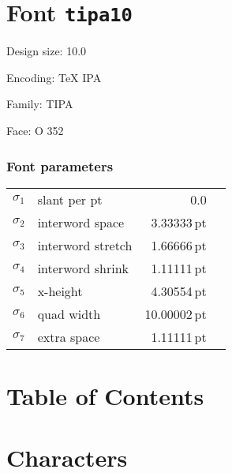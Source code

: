 \documentclass{article}
\newlength{\maxcharwidth}
\begin{document}
\setlength{\maxcharwidth}{60.00016pt}
\addtolength{\maxcharwidth}{2\fboxsep}

\section{Font \texttt{tipa10}}


Design size: 10.0\,

Encoding: TeX IPA

Family: TIPA

Face: O 352

\subsubsection{Font parameters}

\begin{tabular}{@{}llr@{\quad}l}
$\sigma_1$ & slant per pt & 0.0 \\
$\sigma_2$ & interword space & 3.33333\,pt \\
$\sigma_3$ & interword stretch & 1.66666\,pt \\
$\sigma_4$ & interword shrink & 1.11111\,pt \\
$\sigma_5$ & x-height & 4.30554\,pt \\
$\sigma_6$ & quad width & 10.00002\,pt \\
$\sigma_7$ & extra space & 1.11111\,pt \\
\end{tabular}

\clearpage

\section{Table of Contents}

\begingroup



\endgroup

\clearpage

\section{Characters}
\end{document}
